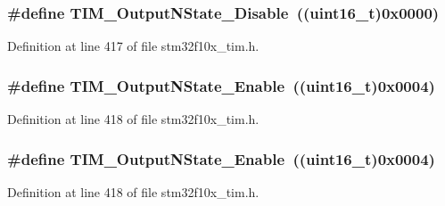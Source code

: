 \subsubsection[{\texorpdfstring{T\+I\+M\+\_\+\+Output\+N\+State\+\_\+\+Disable}{TIM_OutputNState_Disable}}]{\setlength{\rightskip}{0pt plus 5cm}\#define T\+I\+M\+\_\+\+Output\+N\+State\+\_\+\+Disable~(({\bf uint16\+\_\+t})0x0000)}\hypertarget{group___t_i_m___output___compare___n__state_gade8506a50fd6ba58273e9da81f6b0b54}{}\label{group___t_i_m___output___compare___n__state_gade8506a50fd6ba58273e9da81f6b0b54}


Definition at line 417 of file stm32f10x\+\_\+tim.\+h.

\subsubsection[{\texorpdfstring{T\+I\+M\+\_\+\+Output\+N\+State\+\_\+\+Enable}{TIM_OutputNState_Enable}}]{\setlength{\rightskip}{0pt plus 5cm}\#define T\+I\+M\+\_\+\+Output\+N\+State\+\_\+\+Enable~(({\bf uint16\+\_\+t})0x0004)}\hypertarget{group___t_i_m___output___compare___n__state_gac4c08f9d66ce138c6978668020526c6f}{}\label{group___t_i_m___output___compare___n__state_gac4c08f9d66ce138c6978668020526c6f}


Definition at line 418 of file stm32f10x\+\_\+tim.\+h.

\subsubsection[{\texorpdfstring{T\+I\+M\+\_\+\+Output\+N\+State\+\_\+\+Enable}{TIM_OutputNState_Enable}}]{\setlength{\rightskip}{0pt plus 5cm}\#define T\+I\+M\+\_\+\+Output\+N\+State\+\_\+\+Enable~(({\bf uint16\+\_\+t})0x0004)}\hypertarget{group___t_i_m___output___compare___n__state_gac4c08f9d66ce138c6978668020526c6f}{}\label{group___t_i_m___output___compare___n__state_gac4c08f9d66ce138c6978668020526c6f}


Definition at line 418 of file stm32f10x\+\_\+tim.\+h.

